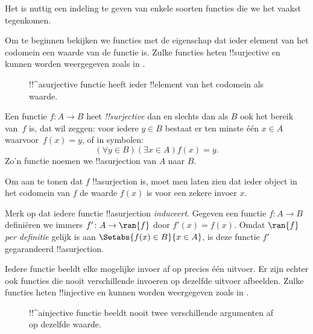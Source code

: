 \documentclass[openany]{memoir}
\begin{document}
\begin{explain}
Het is nuttig een indeling te geven van enkele soorten functies die we
het vaakst tegenkomen.

Om te beginnen bekijken we functies met de eigenschap dat ieder
element van het codomein een waarde van de functie is. Zulke functies
heten !!{surjective} en kunnen worden weergegeven zoals in
.

\begin{figure}
  \caption{!!^a{surjective} functie heeft ieder !!{element} van het
    codomein als waarde.}
\end{figure}
\end{explain}

\begin{defn}
Een functie $f \colon A \rightarrow B$ heet \emph{!!{surjective}} dan
en slechts dan als $B$ ook het bereik van~$f$ is, dat wil zeggen: voor
iedere $y \in B$ bestaat er ten minste één $x \in A$ waarvoor~$f(x) =
y$, of in symbolen:
\[
  (\forall y \in B)(\exists x \in A)f(x) = y.
\]
Zo'n functie noemen we !!a{surjection} van $A$ naar $B$.
\end{defn}

\begin{explain}
Om aan te tonen dat $f$ !!a{surjection} is, moet men laten zien dat
ieder object in het codomein van $f$ de waarde $f(x)$ is voor een
zekere invoer $x$.

Merk op dat iedere functie !!a{surjection} \emph{induceert}. Gegeven
een functie $f \colon A \to B$ definiëren we immers $f' \colon A \to
\ran{f}$ door $f'(x) = f(x)$. Omdat $\ran{f}$ \emph{per definitie}
gelijk is aan $\Setabs{f(x) \in B}{x \in A}$, is deze functie $f'$
gegarandeerd !!a{surjection}.
\end{explain}

\begin{explain}
Iedere functie beeldt elke mogelijke invoer af op precies één uitvoer.
Er zijn echter ook functies die nooit verschillende invoeren op
dezelfde uitvoer afbeelden. Zulke functies heten !!{injective} en
kunnen worden weergegeven zoals in .
\begin{figure}
  \caption{!!^a{injective} functie beeldt nooit twee verschillende
    argumenten af op dezelfde waarde.}
\end{figure}
\end{explain}
\end{document}
